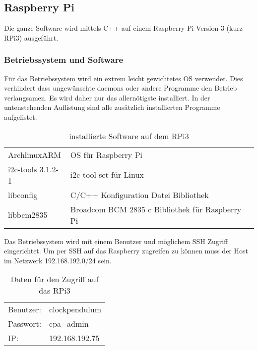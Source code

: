\subsection{Raspberry Pi}
Die ganze Software wird mittels C++ auf einem Raspberry Pi Version 3 (kurz RPi3) ausgeführt.

\subsubsection{Betriebssystem und Software}
Für das Betriebssystem wird ein extrem leicht gewichtetes OS verwendet. Dies verhindert dass ungewünschte daemons oder andere Programme den Betrieb verlangsamen. Es wird daher nur das allernötigste installiert. In der untenstehenden Auflistung sind alle zusätzlich installierten Programme aufgelistet. 

\begin{table}[h]
    \begin{tabular}{ll}
        ArchlinuxARM & OS für Raspberry Pi\\
        i2c-tools 3.1.2-1 & i2c tool set für Linux\\
        libconfig & C/C++ Konfiguration Datei Bibliothek\\
        libbcm2835 & Broadcom BCM 2835 c Bibliothek für Raspberry Pi\\
    \end{tabular}
    \caption{installierte Software auf dem RPi3}
\end{table}

\noindent Das Betriebssystem wird mit einem Benutzer und möglichem SSH Zugriff eingerichtet. Um per SSH auf das Raspberry zugreifen zu können muss der Host im Netzwerk 192.168.192.0/24 sein.
\begin{table}[h]
    \begin{tabular}{ll}
        Benutzer: & clockpendulum \\
        Passwort: & cpa\_admin \\
        IP: & 192.168.192.75 \\
    \end{tabular}
    \caption{Daten für den Zugriff auf das RPi3}
\end{table}
